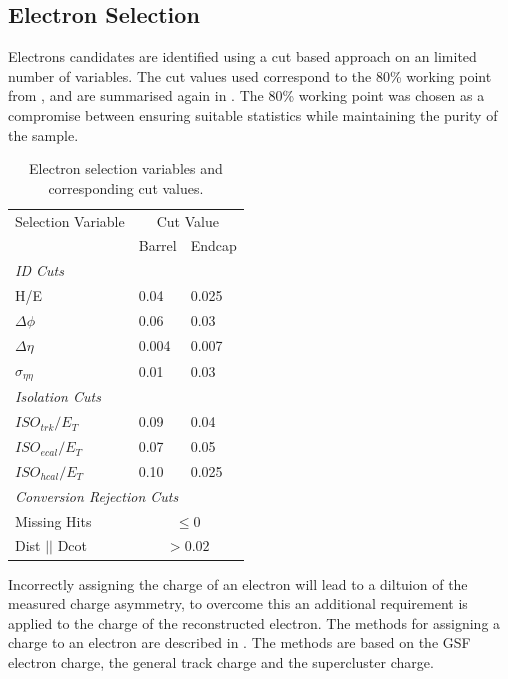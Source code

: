 \subsection{Electron Selection}

Electrons candidates are identified using a cut based approach on an limited
number of variables. The cut values used correspond to the \unit{80}{\%}
working point from , and are summarised again in
. The \unit{80}{\%} working point was chosen as a
compromise between ensuring suitable statistics while maintaining the purity of
the sample.

\begin{table}[htbp]
  \begin{center}
    \leavevmode
    \begin{tabular}{lll} 
    \toprule
      Selection Variable & \multicolumn{2}{c}{Cut Value}\\
                         & Barrel & Endcap\\
      \midrule
      \multicolumn{3}{l}{\emph{ID Cuts}}\\ 
        H/E & 0.04 & 0.025 \\
        $\Delta\phi$ & 0.06 & 0.03 \\
        $\Delta\eta$ & 0.004 & 0.007  \\
        $\sigma_{\eta\eta}$ & 0.01 & 0.03 \\ \midrule
      \multicolumn{3}{l}{\emph{Isolation Cuts}}\\
        $ISO_{trk} / E_T $  & 0.09 & 0.04 \\
        $ISO_{ecal}/ E_T$  & 0.07 & 0.05 \\
        $ISO_{hcal}/ E_T$  & 0.10 & 0.025 \\ \midrule
      \multicolumn{3}{l}{\emph{Conversion Rejection Cuts}}\\ 
        Missing Hits  & \multicolumn{2}{c}{$\leq 0$}\\
        Dist $||$ Dcot   & \multicolumn{2}{c}{$>0.02$}\\
    \bottomrule
    \end{tabular}
    \caption{\label{tab:elecuts} Electron selection variables and corresponding cut values.}
  \end{center}
\end{table}

Incorrectly assigning the charge of an electron will lead to a diltuion of the
measured charge asymmetry, to overcome this an additional requirement is applied
to the charge of the reconstructed electron. The methods for assigning a charge
to an electron are described in . The methods are based
on the GSF electron charge, the general track charge and the supercluster
charge.

